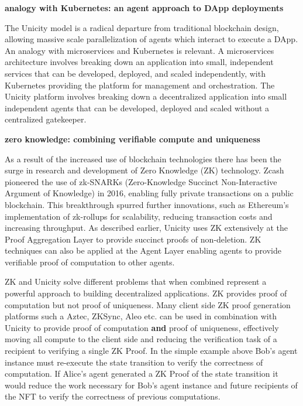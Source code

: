 \documentclass{article}
\begin{document}
\vspace{2mm}
\textbf{analogy with Kubernetes: an agent approach to DApp deployments}
\vspace{2mm}

The Unicity model is a radical departure from traditional blockchain design, allowing massive scale parallelization of agents which interact to execute a DApp. An analogy with microservices and Kubernetes is relevant. A microservices architecture involves breaking down an application into small, independent services that can be developed, deployed, and scaled independently, with Kubernetes providing the platform for management and orchestration. The Unicity platform involves breaking down a decentralized application into small independent agents that can be developed, deployed and scaled without a centralized gatekeeper. 


\vspace{2mm}
\textbf{zero knowledge: combining verifiable compute and  uniqueness}
\vspace{2mm}

As a result of the increased use of blockchain technologies there has been the surge in research and development of Zero Knowledge (ZK) technology. Zcash pioneered the use of zk-SNARKs (Zero-Knowledge Succinct Non-Interactive Argument of Knowledge) in 2016, enabling fully private transactions on a public blockchain. This breakthrough spurred further innovations, such as Ethereum's implementation of zk-rollups for scalability, reducing transaction costs and increasing throughput. As described earlier, Unicity uses ZK extensively at the Proof Aggregation Layer to provide succinct proofs of non-deletion. ZK techniques can also be applied at the Agent Layer enabling agents to provide verifiable proof of computation to other agents.


\vspace{2mm}


ZK and Unicity solve different problems that when combined represent a powerful approach to building decentralized applications. ZK provides proof of computation but not proof of uniqueness. Many client side ZK proof generation platforms such a Aztec, ZKSync, Aleo etc. can be used in combination with Unicity to provide proof of computation \textbf{and} proof of uniqueness, effectively moving all compute to the client side and reducing the verification task of a recipient to verifying a single ZK Proof. In the simple example above Bob's agent instance must re-execute the state transition to verify the correctness of computation. If Alice's agent generated a ZK Proof of the state transition it would reduce the work necessary for Bob's agent instance and future recipients of the NFT to verify the correctness of previous computations.
\end{document}
